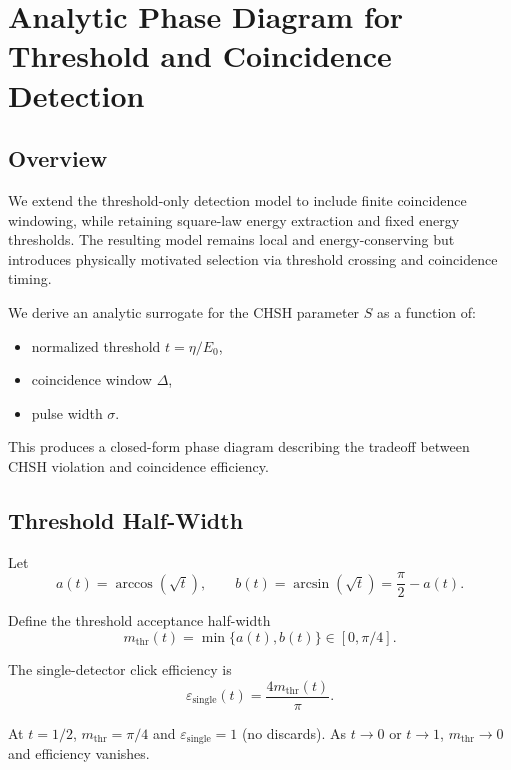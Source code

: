 \section{Analytic Phase Diagram for Threshold and Coincidence Detection}

\subsection{Overview}

We extend the threshold-only detection model to include finite coincidence windowing, while retaining square-law energy extraction and fixed energy thresholds. The resulting model remains local and energy-conserving but introduces physically motivated selection via threshold crossing and coincidence timing.

We derive an analytic surrogate for the CHSH parameter $S$ as a function of:

\begin{itemize}
    \item normalized threshold $t = \eta/E_0$,
    \item coincidence window $\Delta$,
    \item pulse width $\sigma$.
\end{itemize}

This produces a closed-form phase diagram describing the tradeoff between CHSH violation and coincidence efficiency.

\subsection{Threshold Half-Width}

Let
\begin{equation}
a(t) = \arccos(\sqrt{t}),
\qquad
b(t) = \arcsin(\sqrt{t}) = \frac{\pi}{2} - a(t).
\end{equation}

Define the threshold acceptance half-width
\begin{equation}
\boxed{
m_{\mathrm{thr}}(t) = \min\{a(t), b(t)\} \in [0,\pi/4].
}
\end{equation}

The single-detector click efficiency is
\begin{equation}
\boxed{
\varepsilon_{\mathrm{single}}(t) = \frac{4 m_{\mathrm{thr}}(t)}{\pi}.
}
\end{equation}

At $t=1/2$, $m_{\mathrm{thr}}=\pi/4$ and $\varepsilon_{\mathrm{single}}=1$ (no discards). As $t \to 0$ or $t \to 1$, $m_{\mathrm{thr}} \to 0$ and efficiency vanishes.

